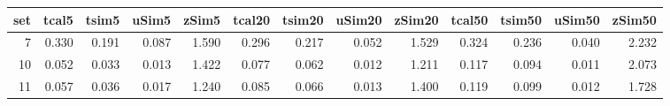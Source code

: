 
\begin{tabular}{r|r|r|r|r|r|r|r|r|r|r|r|r}
\hline
set & tcal5 & tsim5 & uSim5 & zSim5 & tcal20 & tsim20 & uSim20 & zSim20 & tcal50 & tsim50 & uSim50 & zSim50\\
\hline
7 & 0.330 & 0.191 & 0.087 & 1.590 & 0.296 & 0.217 & 0.052 & 1.529 & 0.324 & 0.236 & 0.040 & 2.232\\
\hline
10 & 0.052 & 0.033 & 0.013 & 1.422 & 0.077 & 0.062 & 0.012 & 1.211 & 0.117 & 0.094 & 0.011 & 2.073\\
\hline
11 & 0.057 & 0.036 & 0.017 & 1.240 & 0.085 & 0.066 & 0.013 & 1.400 & 0.119 & 0.099 & 0.012 & 1.728\\
\hline
\end{tabular}
